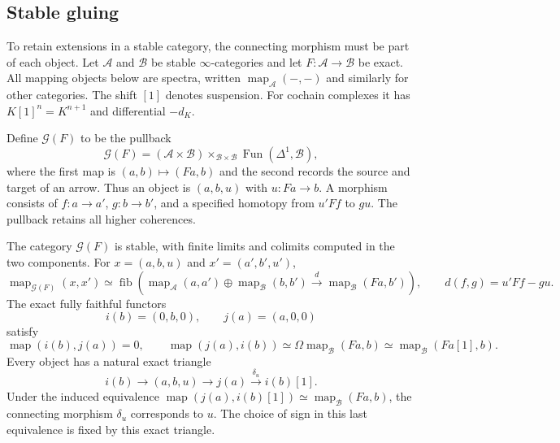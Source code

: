 \subsection{Stable gluing}

To retain extensions in a stable category, the connecting morphism must
be part of each object. Let $\mathcal A$ and $\mathcal B$ be stable
$\infty$-categories and let $F:\mathcal A\to\mathcal B$ be exact.
All mapping objects below are spectra, written
$\operatorname{map}_{\mathcal A}(-,-)$ and similarly for other categories.
The shift $[1]$ denotes suspension. For cochain complexes it has
$K[1]^n=K^{n+1}$ and differential $-d_K$.

Define $\mathcal G(F)$ to be the pullback
\[
 \mathcal G(F)
 = (\mathcal A\times\mathcal B)
   \mathop{\times}_{\mathcal B\times\mathcal B}
   \operatorname{Fun}(\Delta^1,\mathcal B),
\]
where the first map is $(a,b)\mapsto(Fa,b)$ and the second records the
source and target of an arrow. Thus an object is $(a,b,u)$ with
$u:Fa\to b$. A morphism consists of $f:a\to a'$, $g:b\to b'$, and a
specified homotopy from $u'Ff$ to $gu$. The pullback retains all higher
coherences.

\begin{proposition}
\label{v4-arith:eis:extension-category}
The category $\mathcal G(F)$ is stable, with finite limits and colimits
computed in the two components. For $x=(a,b,u)$ and $x'=(a',b',u')$,
\begin{equation}\label{v4-arith:eis:sector-gluing-maps}
 \operatorname{map}_{\mathcal G(F)}(x,x')
 \simeq\operatorname{fib}\left(
 \operatorname{map}_{\mathcal A}(a,a')\oplus
 \operatorname{map}_{\mathcal B}(b,b')
 \xrightarrow{\ d\ }
 \operatorname{map}_{\mathcal B}(Fa,b')\right),
 \qquad d(f,g)=u'Ff-gu.
\end{equation}
The exact fully faithful functors
\[
 i(b)=(0,b,0),\qquad j(a)=(a,0,0)
\]
satisfy
\[
 \operatorname{map}(i(b),j(a))=0,\qquad
 \operatorname{map}(j(a),i(b))
 \simeq\Omega\operatorname{map}_{\mathcal B}(Fa,b)
 \simeq\operatorname{map}_{\mathcal B}(Fa[1],b).
\]
Every object has a natural exact triangle
\[
 i(b)\longrightarrow(a,b,u)\longrightarrow j(a)
       \xrightarrow{\delta_u}i(b)[1].
\]
Under the induced equivalence
$\operatorname{map}(j(a),i(b)[1])\simeq
\operatorname{map}_{\mathcal B}(Fa,b)$, the connecting morphism
$\delta_u$ corresponds to $u$. The choice of sign in this last
equivalence is fixed by this exact triangle.
\end{proposition}

